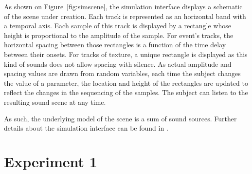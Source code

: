 \documentclass[12pt]{elsarticle}
\newcommand{\cf}{cf.}
\begin{document}

As shown on Figure~\ref{fig:simscene}, the simulation interface displays a schematic of the scene under creation. Each track is represented as an horizontal band with a temporal axis. Each sample of this track is displayed by a rectangle whose height is proportional to the amplitude of the sample. For event's tracks, the horizontal spacing between those rectangles is a function of the time delay between their onsets. For tracks of texture, a unique rectangle is displayed as this kind of sounds does not allow spacing with silence. As actual amplitude and spacing values are drawn from random variables, each time the subject changes the value of a parameter, the location and height of the rectangles are updated to reflect the changes in the sequencing of the samples. The subject can listen to the resulting sound scene at any time.


As such, the underlying model of the scene is a sum of sound sources. Further details about the simulation interface can be found in \cite{rossignol2015simscene}.




\section{Experiment 1}
\label{sec:simulation}
\end{document}
